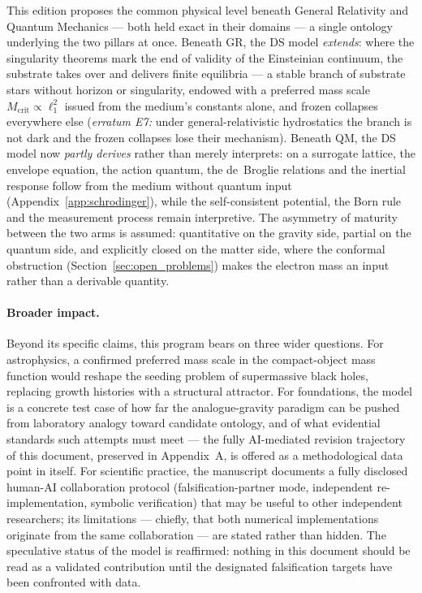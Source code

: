 \documentclass[11pt,a4paper]{article}
\theoremstyle{plain}
\theoremstyle{remark}
\begin{document}
This edition proposes the common physical level beneath General Relativity and Quantum Mechanics --- both held exact in their domains --- a single ontology underlying the two pillars at once. Beneath GR, the DS model \emph{extends}: where the singularity theorems mark the end of validity of the Einsteinian continuum, the substrate takes over and delivers finite equilibria --- a stable branch of substrate stars without horizon or singularity, endowed with a preferred mass scale $M_{\text{crit}} \propto \ell_1^2$ issued from the medium's constants alone, and frozen collapses everywhere else (\emph{erratum E7:} under general-relativistic hydrostatics the branch is not dark and the frozen collapses lose their mechanism). Beneath QM, the DS model now \emph{partly derives} rather than merely interprets: on a surrogate lattice, the envelope equation, the action quantum, the de~Broglie relations and the inertial response follow from the medium without quantum input (Appendix~\ref{app:schrodinger}), while the self-consistent potential, the Born rule and the measurement process remain interpretive. The asymmetry of maturity between the two arms is assumed: quantitative on the gravity side, partial on the quantum side, and explicitly closed on the matter side, where the conformal obstruction (Section~\ref{sec:open_problems}) makes the electron mass an input rather than a derivable quantity.

\paragraph{Broader impact.} Beyond its specific claims, this program bears on three wider questions. For astrophysics, a confirmed preferred mass scale in the compact-object mass function would reshape the seeding problem of supermassive black holes, replacing growth histories with a structural attractor. For foundations, the model is a concrete test case of how far the analogue-gravity paradigm \cite{barcelo, volovik} can be pushed from laboratory analogy toward candidate ontology, and of what evidential standards such attempts must meet --- the fully AI-mediated revision trajectory of this document, preserved in Appendix~A, is offered as a methodological data point in itself. For scientific practice, the manuscript documents a fully disclosed human-AI collaboration protocol (falsification-partner mode, independent re-implementation, symbolic verification) that may be useful to other independent researchers; its limitations --- chiefly, that both numerical implementations originate from the same collaboration --- are stated rather than hidden. The speculative status of the model is reaffirmed: nothing in this document should be read as a validated contribution until the designated falsification targets have been confronted with data.
\end{document}
